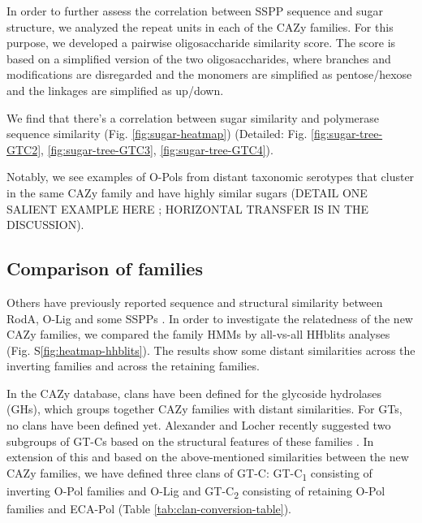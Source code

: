 \documentclass{article}
\begin{document}
In order to further assess the correlation between SSPP sequence and sugar structure, we analyzed the repeat units in each of the CAZy families. For this purpose, we developed a pairwise oligosaccharide similarity score. The score is based on a simplified version of the two oligosaccharides, where branches and modifications are disregarded and the monomers are simplified as pentose/hexose and the linkages are simplified as up/down. 

We find that there's a correlation between sugar similarity and polymerase sequence similarity (Fig. \ref{fig:sugar-heatmap}) (Detailed: Fig. \ref{fig:sugar-tree-GTC2}, \ref{fig:sugar-tree-GTC3}, \ref{fig:sugar-tree-GTC4}). 

Notably, we see examples of O-Pols from distant taxonomic serotypes that cluster in the same CAZy family and have highly similar sugars (DETAIL ONE SALIENT EXAMPLE HERE ; HORIZONTAL TRANSFER IS IN THE DISCUSSION). 

\subsection{Comparison of families}

Others have previously reported sequence and structural similarity between RodA, O-Lig and some SSPPs \cite{alexander_emerging_2023,ashraf_structural_2022,meeske_seds_2016}. In order to investigate the relatedness of the new CAZy families, we compared the family HMMs by all-vs-all HHblits analyses \cite{remmert_hhblits_2012} (Fig. S\ref{fig:heatmap-hhblits}). The results show some distant similarities across the inverting families and across the retaining families.

In the CAZy database, clans have been defined for the glycoside hydrolases (GHs), which groups together CAZy families with distant similarities. For GTs, no clans have been defined yet. Alexander and Locher recently suggested two subgroups of GT-Cs based on the structural features of these families \cite{alexander_emerging_2023}. In extension of this and based on the above-mentioned similarities between the new CAZy families, we have defined three clans of GT-C: GT-C\textsubscript{1} consisting of inverting O-Pol families and O-Lig and GT-C\textsubscript{2} consisting of retaining O-Pol families and ECA-Pol (Table \ref{tab:clan-conversion-table}). 
\end{document}
